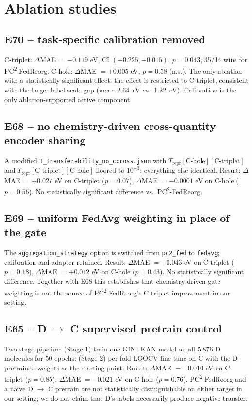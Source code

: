 \documentclass[11pt,a4paper]{article}
\newcommand{\PC}{PC\textsuperscript{2}-FedReorg}
\begin{document}
\section{Ablation studies}\label{si:abl}

\subsection{E70 -- task-specific calibration removed}\label{si:abl-e70}
C-triplet: $\Delta$MAE $= -0.119$ eV, CI $(-0.225, -0.015)$, $p = 0.043$, 35/14 wins for \PC{}. C-hole: $\Delta$MAE $= +0.005$ eV, $p = 0.58$ (n.s.). The only ablation with a statistically significant effect; the effect is restricted to C-triplet, consistent with the larger label-scale gap (mean \SI{2.64}{\eV} vs.\ \SI{1.22}{\eV}). Calibration is the only ablation-supported active component.

\subsection{E68 -- no chemistry-driven cross-quantity encoder sharing}
A modified \texttt{T\_transferability\_no\_ccross.json} with $T_{\mathrm{repr}}[\mathrm{C\text{-}hole}][\mathrm{C\text{-}triplet}]$ and $T_{\mathrm{repr}}[\mathrm{C\text{-}triplet}][\mathrm{C\text{-}hole}]$ floored to $10^{-3}$; everything else identical. Result: $\Delta$MAE $= +0.027$ eV on C-triplet ($p = 0.07$), $\Delta$MAE $= -0.0001$ eV on C-hole ($p = 0.56$). No statistically significant difference vs.\ \PC{}.

\subsection{E69 -- uniform FedAvg weighting in place of the gate}
The \texttt{aggregation\_strategy} option is switched from \texttt{pc2\_fed} to \texttt{fedavg}; calibration and adapter retained. Result: $\Delta$MAE $= +0.043$ eV on C-triplet ($p = 0.18$), $\Delta$MAE $= +0.012$ eV on C-hole ($p = 0.43$). No statistically significant difference. Together with E68 this establishes that chemistry-driven gate weighting is not the source of \PC{}'s C-triplet improvement in our setting.

\subsection{E65 -- D $\to$ C supervised pretrain control}\label{si:abl-e65}
Two-stage pipeline: (Stage 1) train one GIN+KAN model on all 5{,}876 D molecules for 50 epochs; (Stage 2) per-fold LOOCV fine-tune on C with the D-pretrained weights as the starting point. Result: $\Delta$MAE $= -0.010$ eV on C-triplet ($p = 0.85$), $\Delta$MAE $= -0.021$ eV on C-hole ($p = 0.76$). \PC{} and a naive D $\to$ C pretrain are not statistically distinguishable on either target in our setting; we do not claim that D's labels necessarily produce negative transfer.
\end{document}
